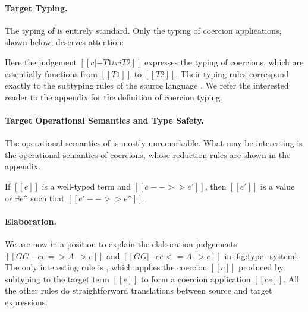\paragraph{Target Typing.}

The typing of \tname is entirely standard. Only the typing of coercion
applications, shown below, deserves attention:
\begin{mathpar}
\end{mathpar}
Here the judgement $[[c |- T1 tri T2]]$ expresses the typing of coercions, which
are essentially functions from $[[T1]]$ to $[[T2]]$. Their typing
rules correspond exactly to the subtyping rules of the source language \name. We
refer the interested reader to the appendix for the definition of coercion
typing.




\paragraph{Target Operational Semantics and Type Safety.}

The operational semantics of \tname is mostly unremarkable. What may be
interesting is the operational semantics of coercions, whose reduction rules are
shown in the appendix.
\begin{mtheorem}
  If $[[e]]$ is a well-typed \tname term and $[[e -->> e']]$, then $[[e']]$ is a
  value or $\exists e''$ such that $[[e' -->> e'']]$.
\end{mtheorem}

\paragraph{Elaboration.}
\begin{comment}
The subtyping judgement in \cref{fig:subtype_decl} has the form $[[A <: B ~~>
c]]$, which says that the subtyping
derivation of $[[A <: B]]$ produces a coercion $[[c]]$ that is used to convert a
term of type $[[ |A| ]]$ to type $[[ |B| ]]$. Each
subtyping rule has its own specific form of coercion.
\end{comment}
We are now in a position to explain the elaboration judgements $[[GG |- ee
=> A ~~> e]]$ and $[[GG |- ee <= A ~~> e]]$ in \cref{fig:type_system}. The only
interesting rule is , which applies the coercion $[[c]]$ produced by
subtyping to the target term $[[e]]$ to form a coercion application
$[[c e]]$. All the other rules do straightforward translations between
source and target expressions.


